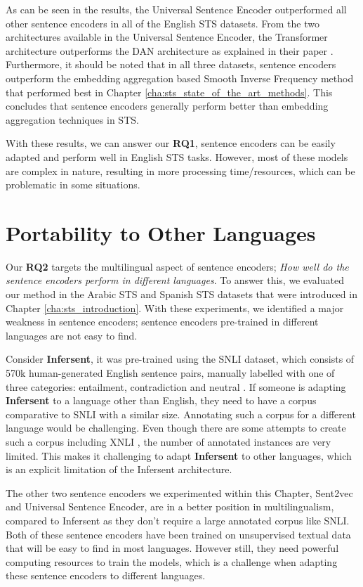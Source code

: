 As can be seen in the results, the Universal Sentence Encoder outperformed all other sentence encoders in all of the English STS datasets. From the two architectures available in the Universal Sentence Encoder, the Transformer architecture outperforms the DAN architecture as explained in their paper \autocite{cer2018universal}. Furthermore, it should be noted that in all three datasets, sentence encoders outperform the embedding aggregation based Smooth Inverse Frequency method that performed best in Chapter \ref{cha:sts_state_of_the_art_methods}. This concludes that sentence encoders generally perform better than embedding aggregation techniques in STS. 

With these results, we can answer our \textbf{RQ1}, sentence encoders can be easily adapted and perform well in English STS tasks. However, most of these models are complex in nature, resulting in more processing time/resources, which can be problematic in some situations. 


\section{Portability to Other Languages}
\label{sec:sentence_languages}
Our \textbf{RQ2} targets the multilingual aspect of sentence encoders; \textit{How well do the sentence encoders perform in different languages}. To answer this, we evaluated our method in the Arabic STS and Spanish STS datasets that were introduced in Chapter \ref{cha:sts_introduction}. With these experiments, we identified a major weakness in sentence encoders; sentence encoders pre-trained in different languages are not easy to find. 

Consider \textbf{Infersent}, it was pre-trained using the SNLI dataset, which consists of 570k human-generated English sentence pairs, manually labelled with one of three categories: entailment, contradiction and neutral \autocite{bowman-etal-2015-large}. If someone is adapting \textbf{Infersent} to a language other than English, they need to have a corpus comparative to SNLI with a similar size. Annotating such a corpus for a different language would be challenging. Even though there are some attempts to create such a corpus including XNLI \autocite{conneau-etal-2018-xnli}, the number of annotated instances are very limited. This makes it challenging to adapt \textbf{Infersent} to other languages, which is an explicit limitation of the Infersent architecture. 

The other two sentence encoders we experimented within this Chapter, Sent2vec and Universal Sentence Encoder, are in a better position in multilingualism, compared to Infersent as they don't require a large annotated corpus like SNLI. Both of these sentence encoders have been trained on unsupervised textual data that will be easy to find in most languages. However still, they need powerful computing resources to train the models, which is a challenge when adapting these sentence encoders to different languages. 


